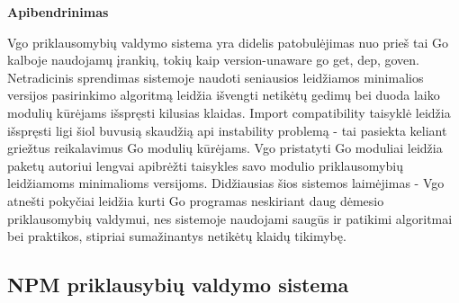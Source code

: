 \bigbreak
{\bf Apibendrinimas}
\bigbreak

Vgo priklausomybių valdymo sistema yra didelis patobulėjimas nuo prieš tai Go kalboje naudojamų įrankių, tokių kaip version-unaware go get, dep, goven. Netradicinis sprendimas sistemoje naudoti seniausios leidžiamos minimalios versijos pasirinkimo algoritmą leidžia išvengti netikėtų gedimų bei duoda laiko modulių kūrėjams išspręsti kilusias klaidas. Import compatibility taisyklė leidžia išspręsti ligi šiol buvusią skaudžią api instability problemą - tai pasiekta keliant griežtus reikalavimus Go modulių kūrėjams. Vgo pristatyti Go moduliai leidžia paketų autoriui lengvai apibrėžti taisykles savo modulio priklausomybių leidžiamoms minimalioms versijoms. Didžiausias šios sistemos laimėjimas - Vgo atnešti pokyčiai leidžia kurti Go programas neskiriant daug dėmesio priklausomybių valdymui, nes sistemoje naudojami saugūs ir patikimi algoritmai bei praktikos, stipriai sumažinantys netikėtų klaidų tikimybę.

\subsection{NPM priklausybių valdymo sistema}


